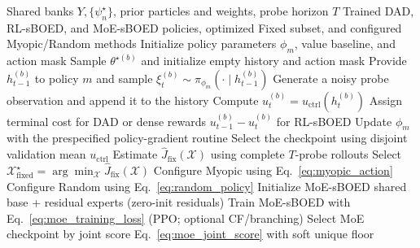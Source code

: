 \documentclass[11pt]{article}
\begin{document}
\begin{algorithm}[htbp]
\caption{Preparation of DAD, RL-sBOED, MoE-sBOED, Myopic, Fixed, and Random methods}
\label{alg:method_preparation}
\begin{algorithmic}[1]
\Require Shared banks \(Y,\{\psi_n^\star\}\), prior particles and weights, probe horizon \(T\)
\Ensure Trained DAD, RL-sBOED, and MoE-sBOED policies, optimized Fixed subset, and configured Myopic/Random methods
\State Initialize policy parameters \(\phi_m\), value baseline, and action mask
\Repeat
        \State Sample \(\theta^{\star(b)}\) and initialize empty history and action mask
            \State Provide \(h_{t-1}^{(b)}\) to policy \(m\) and sample \(\xi_t^{(b)}\sim\pi_{\phi_m}(\cdot\mid h_{t-1}^{(b)})\)
            \State Generate a noisy probe observation and append it to the history
            \State Compute \(u_t^{(b)}=u_{\mathrm{ctrl}}(h_t^{(b)})\)
        \EndFor
        \State Assign terminal cost for DAD or dense rewards \(u_{t-1}^{(b)}-u_t^{(b)}\) for RL-sBOED
    \EndFor
    \State Update \(\phi_m\) with the prespecified policy-gradient routine
\State Select the checkpoint using disjoint validation mean \(u_{\mathrm{ctrl}}\)
\EndFor
{}
    \State Estimate \(\widehat J_{\mathrm{fix}}(\mathcal X)\) using complete \(T\)-probe rollouts
\EndFor
\State Select \(\mathcal X_{\mathrm{fixed}}^{\star}=\arg\min_{\mathcal X}\widehat J_{\mathrm{fix}}(\mathcal X)\)
\State Configure Myopic using Eq.~\eqref{eq:myopic_action}
\State Configure Random using Eq.~\eqref{eq:random_policy}
\State Initialize MoE-sBOED shared base + residual experts (zero-init residuals)
\State Train MoE-sBOED with Eq.~\eqref{eq:moe_training_loss} (PPO; optional CF/branching)
\State Select MoE checkpoint by joint score Eq.~\eqref{eq:moe_joint_score} with soft unique floor
\end{algorithmic}
\end{algorithm}
\end{document}
